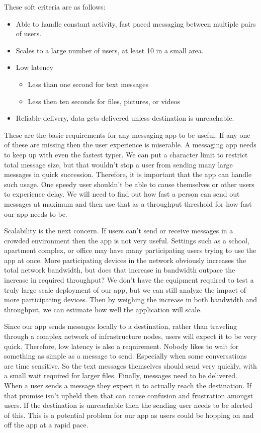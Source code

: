 \documentclass[10pt]{article}
\begin{document}
These soft criteria are as follows:
\begin{itemize}
    \item Able to handle constant activity, fast paced messaging between multiple pairs of users.
    \item Scales to a large number of users, at least 10 in a small area.
    \item Low latency
          \begin{itemize}
              \item Less than one second for text messages
              \item Less then ten seconds for files, pictures, or videos
          \end{itemize}
    \item Reliable delivery, data gets delivered unless destination is unreachable.
\end{itemize}
These are the basic requirements for any messaging app to be useful. If any one of these are missing then the user experience is miserable.
A messaging app needs to keep up with even the fastest typer. We can put a character limit to restrict total message size, but that wouldn't stop a user from sending many large messages in quick succession. Therefore, it is important that the app can handle such usage. One speedy user shouldn't be able to cause themselves or other users to experience delay. We will need to find out how fast a person can send out messages at maximum and then use that as a throughput threshold for how fast our app needs to be.

Scalability is the next concern. If users can't send or receive messages in a crowded environment then the app is not very useful. Settings such as a school, apartment complex, or office may have many participating users trying to use the app at once. More participating devices in the network obviously increases the total network bandwidth, but does that increase in bandwidth outpace the increase in required throughput? We don't have the equipment required to test a truly large scale deployment of our app, but we can still analyze the impact of more participating devices. Then by weighing the increase in both bandwidth and throughput, we can estimate how well the application will scale.

Since our app sends messages locally to a destination, rather than traveling through a complex network of infrastructure nodes, users will expect it to be very quick. Therefore, low latency is also a requirement. Nobody likes to wait for something as simple as a message to send. Especially when some conversations are time sensitive. So the text messages themselves should send very quickly, with a small wait required for larger files.
Finally, messages need to be delivered. When a user sends a message they expect it to actually reach the destination. If that promise isn't upheld then that can cause confusion and frustration amongst users. If the destination is unreachable then the sending user needs to be alerted of this. This is a potential problem for our app as users could be hopping on and off the app at a rapid pace.
\end{document}
